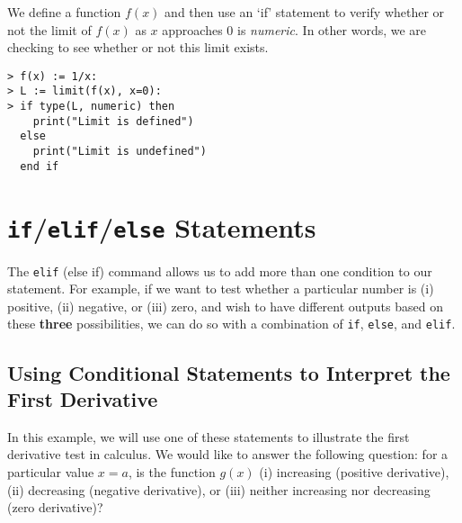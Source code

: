 
We define a function $f(x)$ and then use an `if' statement to verify whether or not the limit of $f(x)$ as $x$ approaches $0$ is \textit{numeric}. In other words, we are checking to see whether or not this limit exists.

\begin{maplegroup}
\begin{mapleinput}
\begin{verbatim}
> f(x) := 1/x:
> L := limit(f(x), x=0):
> if type(L, numeric) then
    print("Limit is defined")
  else
    print("Limit is undefined")
  end if
\end{verbatim}
\end{mapleinput}
\mapleresult
{}
\begin{maplelatex}
\end{maplelatex}
\end{maplegroup}

\section{\texttt{if}/\texttt{elif}/\texttt{else} Statements}


The \texttt{elif} (else if) command allows us to add more than one condition to our statement. For example, if we want to test whether a particular number is (i) positive, (ii) negative, or (iii) zero, and wish to have different outputs based on these \textbf{three} possibilities, we can do so with a combination of \texttt{if}, \texttt{else}, and \texttt{elif}.\\

\subsection{Using Conditional Statements to Interpret the First Derivative}
In this example, we will use one of these statements to illustrate the first derivative test in calculus. We would like to answer the following question: for a particular value $x=a$, is the function $g(x)$ (i) increasing (positive derivative), (ii) decreasing (negative derivative), or (iii) neither increasing nor decreasing (zero derivative)?


